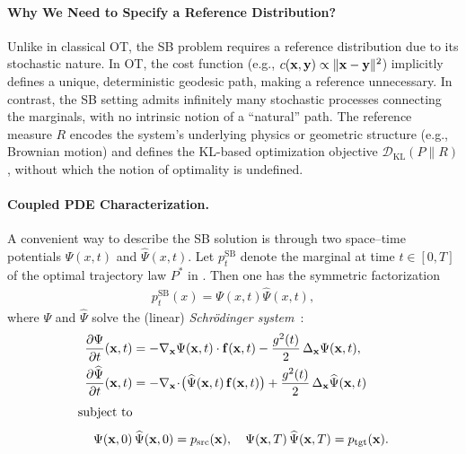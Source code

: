 \paragraph{Why We Need to Specify a Reference Distribution?} 
Unlike in classical OT, the SB problem requires a reference distribution due to its stochastic nature. In OT, the cost function (e.g., $c({\mathbf{x}}, {\mathbf{y}}) \propto \|{\mathbf{x}} - {\mathbf{y}}\|^2$) implicitly defines a unique, deterministic geodesic path, making a reference unnecessary. In contrast, the SB setting admits infinitely many stochastic processes connecting the marginals, with no intrinsic notion of a ``natural'' path. The reference measure $R$ encodes the system's underlying physics or geometric structure (e.g., Brownian motion) and defines the KL-based optimization objective $\mathcal{D}_{\mathrm{KL}}(P \| R)$, without which the notion of optimality is undefined.



\paragraph{Coupled PDE Characterization.}  
A convenient way to describe the SB solution is through two 
space–time potentials $\Psi(x,t)$ and $\widehat{\Psi}(x,t)$. Let
$p_t^{\mathrm{SB}}$ denote the marginal at time $t\in[0,T]$ of the optimal
trajectory law $P^*$ in . Then one has the
symmetric factorization~\citep{dai1991stochastic}
\begin{align}\label{eq:sb-symmetry}
p_t^{\mathrm{SB}}(x) = \Psi(x,t) \widehat{\Psi}(x,t),
\end{align}
where $\Psi$ and $\widehat{\Psi}$ solve the (linear) \emph{Schrödinger system}~\citep{caluya2021wasserstein,chen2021stochastic,chenlikelihood}:
\begin{align}
\begin{aligned}\label{eq:pde-schrodinger}
\frac{\partial \Psi}{\partial t}(\mathbf{x},t)
  &= -\nabla_{\mathbf{x}} \Psi(\mathbf{x},t) \cdot {\mathbf{f}}(\mathbf{x},t)
     - \frac{g^2(t)}{2}\,\Delta_\mathbf{x} \Psi(\mathbf{x},t),  \\
\frac{\partial \widehat{\Psi}}{\partial t}(\mathbf{x},t)
  &= -\nabla_{\mathbf{x}}\!\cdot\!\bigl(\widehat{\Psi}(\mathbf{x},t)\,{\mathbf{f}}(\mathbf{x},t)\bigr)
     + \frac{g^2(t)}{2}\,\Delta_\mathbf{x}\widehat{\Psi}(\mathbf{x},t) 
\\[4pt] \text{subject to}  \\[4pt]
\Psi(\mathbf{x},0)&\,\widehat{\Psi}(\mathbf{x},0) = p_{\mathrm{src}}(\mathbf{x}),
\quad
\Psi(\mathbf{x},T)\,\widehat{\Psi}(\mathbf{x},T) = p_{\mathrm{tgt}}(\mathbf{x}). 
\end{aligned}
\end{align}

